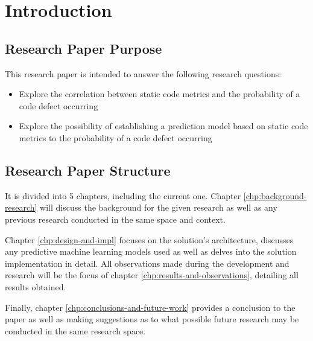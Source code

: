 \chapter{Introduction}\label{chp:intro}
\section{Research Paper Purpose}
This research paper is intended to answer the following research questions:
\begin{itemize}
\item Explore the correlation between static code metrics and the probability of a code defect occurring
\item Explore the possibility of establishing a prediction model based on static code metrics to the probability of a code defect occurring 
\end{itemize}
\section{Research Paper Structure}
It is divided into 5 chapters, including the current one. Chapter \ref{chp:background-research} will discuss the background for the given research as well as any previous research conducted in the same space and context. 

Chapter \ref{chp:design-and-impl} focuses on the solution's architecture, discusses any predictive machine learning models used as well as delves into the solution implementation in detail. All observations made during the development and research will be the focus of chapter \ref{chp:results-and-observations}, detailing all results obtained.

Finally, chapter \ref{chp:conclusions-and-future-work} provides a conclusion to the paper as well as making suggestions as to what possible future research may be conducted in the same research space.

